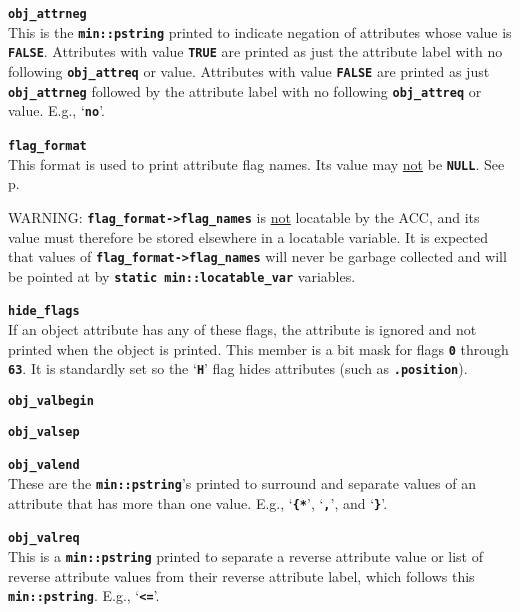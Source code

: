 \documentclass[12pt]{article}
\makeatletter
\newcommand{\TT}[1]{{\tt \bfseries #1}}
\newcommand{\ttmkey}[2]{\TT{#1}\index{#1@{\tt #1}!#2}}
\newcommand{\pagref}[1]{p\pageref{#1}}
\newcommand{\EOL}{\penalty \exhyphenpenalty}
\newenvironment{itemlist}[1][1.2in]%
	{\begin{list}{}{\setlength{\labelwidth}{#1}%
		        \setlength{\leftmargin}{\labelwidth}%
		        \addtolength{\leftmargin}{+0.2in}%
		        \renewcommand{\makelabel}[1]{##1\hfill}}}%
	{\end{list}}
\makeatother
\begin{document}
\begin{itemlist}[0.2in]
\item[\ttmkey{obj\_attrneg}{in {\tt min::obj\_format}}]~\\
This is the \TT{min::pstring} printed to indicate
negation of attributes whose value is \TT{FALSE}.
Attributes with value \TT{TRUE} are printed as just
the attribute label with no following \TT{obj\_\EOL attreq} or value.
Attributes with value \TT{FALSE} are printed as just
\TT{obj\_\EOL attrneg} followed by
the attribute label with no following \TT{obj\_\EOL attreq} or value.
E.g., `\TT{no\textvisiblespace}'.

\item[\ttmkey{flag\_format}{in {\tt min::obj\_format}}]~\\
This format is used to print attribute flag names.  Its value may
\underline{not} be \TT{NULL}.  See \pagref{ATTRIBUTE-FLAG-NAMES}.

WARNING: \TT{flag\_format->flag\_names} is
\underline{not} locatable by the ACC, and its value must therefore be
stored elsewhere in a locatable variable.  It is expected that values of
\TT{flag\_\EOL format->\EOL flag\_\EOL names} will never be garbage
collected and will be pointed at by
\TT{static min::\EOL locatable\_\EOL var} variables.

\item[\ttmkey{hide\_flags}{in {\tt min::obj\_format}}]~\\
If an object attribute has any of these flags, the attribute is ignored
and not printed when the object is printed.  This member is a bit
mask for flags \TT{0} through \TT{63}.  It is standardly set so the
`\TT{H}' flag hides attributes (such as \TT{.position}).

\item[\ttmkey{obj\_valbegin}{in {\tt min::obj\_format}}]
\item[\ttmkey{obj\_valsep}{in {\tt min::obj\_format}}]\vspace{-2ex}
\item[\ttmkey{obj\_valend}{in {\tt min::obj\_format}}]\vspace{-2ex}~\\
These are the \TT{min::pstring}'s printed to surround and
separate values of an attribute that has more than one
value.  E.g., `\TT{\{*}', `\TT{,}', and `\TT{*\}}'.

\item[\ttmkey{obj\_valreq}{in {\tt min::obj\_format}}]~\\
This is a \TT{min::pstring} printed to separate a reverse
attribute value or list of reverse attribute values from
their reverse attribute label, which follows this \TT{min::pstring}.
E.g., `\TT{<=}'.

\end{itemlist}
\end{document}
